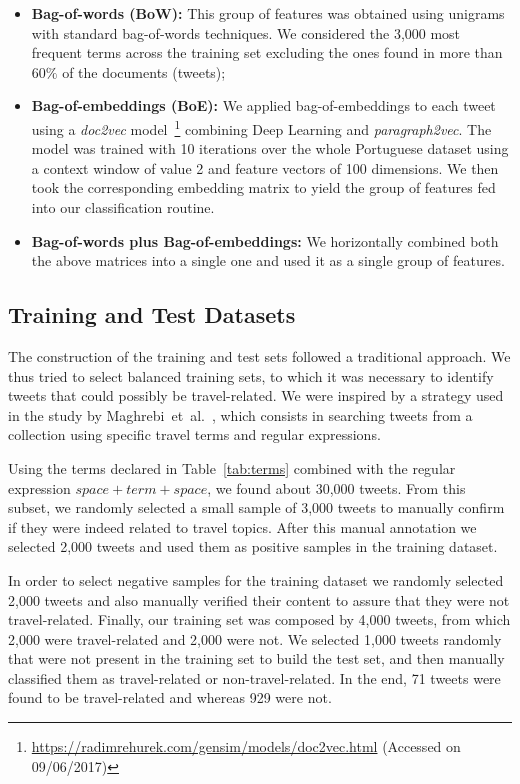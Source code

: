\begin{itemize}
\item \textbf{Bag-of-words (BoW):} This group of features was obtained using unigrams with standard bag-of-words techniques. We considered the 3,000 most frequent terms across the training set excluding the ones found in more than 60$\%$ of the documents (tweets);

\item \textbf{Bag-of-embeddings (BoE):} We applied bag-of-embeddings to each tweet using a \textit{doc2vec} model~\footnote{\url{https://radimrehurek.com/gensim/models/doc2vec.html} (Accessed on 09/06/2017)} combining Deep Learning and \textit{paragraph2vec}. The model was trained with 10 iterations over the whole Portuguese dataset using a context window of value 2 and feature vectors of 100 dimensions. We then took the corresponding embedding matrix to yield the group of features fed into our classification routine. 

\item \textbf{Bag-of-words plus Bag-of-embeddings:} We horizontally combined both the above matrices into a single one and used it as a single group of features.
\end{itemize}

\subsection{Training and Test Datasets}\label{subsec:training_test_datasets_portuguese}
The construction of the training and test sets followed a traditional approach. We thus tried to select balanced training sets, to which it was necessary to identify tweets that could possibly be travel-related. We were inspired by a strategy used in the study by Maghrebi~et~al.~\cite{maghrebi2016transportation}, which consists in searching tweets from a collection using specific travel terms and regular expressions.

Using the terms declared in Table~\ref{tab:terms} combined with the regular expression $space + term + space$, we found about 30,000 tweets. From this subset, we randomly selected a small sample of 3,000 tweets to manually confirm if they were indeed related to travel topics. After this manual annotation we selected 2,000 tweets and used them as positive samples in the training dataset.

In order to select negative samples for the training dataset we randomly selected 2,000 tweets and also manually verified their content to assure that they were not travel-related. Finally, our training set was composed by 4,000 tweets, from which 2,000 were travel-related and 2,000 were not. 
We selected 1,000 tweets randomly that were not present in the training set to build the test set, and then manually classified them as travel-related or non-travel-related. In the end, 71 tweets were found to be travel-related and whereas 929 were not.

